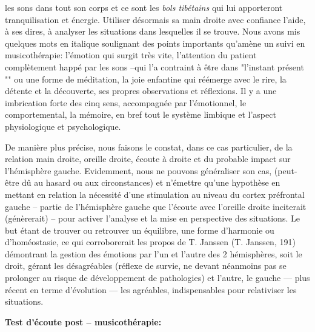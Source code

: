             les sons dans tout son corps et ce sont les\textit{ bols
              tibétains } qui lui
            apporteront tranquilisation et
            énergie. Utiliser désormais sa main
            droite avec confiance l'aide, à ses dires, à analyser les
            situations dans lesquelles il se trouve.
            Nous avons mis quelques mots en italique soulignant des  points
            importants qu'amè\-ne un suivi en musicothérapie: l'émotion qui surgit très
            vite,
            l'attention du patient complètement happé par les sons --qui l'a
            contraint à être dans "l'instant présent "" ou une forme de méditation, la joie
            enfantine qui réémerge avec le rire, la détente et la découverte,
            ses propres observations et réflexions.
            Il y a une imbrication forte des cinq sens, accompagnée par l'émotionnel, le comportemental, la
            mémoire, en bref tout le système limbique et l'aspect
            physiologique et psychologique.

            De manière plus précise, nous faisons le constat, dans ce cas
            particulier,  de la relation main droite, oreille droite, écoute
            à droite et du probable impact sur l'hémisphère gauche.
            Evidemment, nous ne pouvons généraliser son cas, (peut-être dû au hasard ou aux circonstances) et n'émettre qu'une hypothèse
            en mettant en relation la nécessité d'une stimulation au niveau du cortex préfrontal
            gauche -- partie de l'hémisphère gauche que l'écoute avec
            l'oreille droite inciterait (génèrerait) -- pour activer l'analyse et la
            mise en perspective des situations. Le but étant de trouver ou
            retrouver un équilibre, une forme d'harmonie ou d'homéostasie, ce qui corroborerait les
            propos de T. Janssen (T. Janssen, 191)  démontrant la gestion des émotions par
            l'un et l'autre des 2 hémisphères, soit le droit,  gérant les désagréables
            (réflexe de survie, ne devant néanmoins pas se prolonger au risque de
            développement de pathologies)
            et l'autre, le gauche --- plus récent en terme d'évolution ---  les
            agréables, indispensables pour relativiser       les situations.


            \textbf{ Test d'écoute post -- musicothérapie:}



